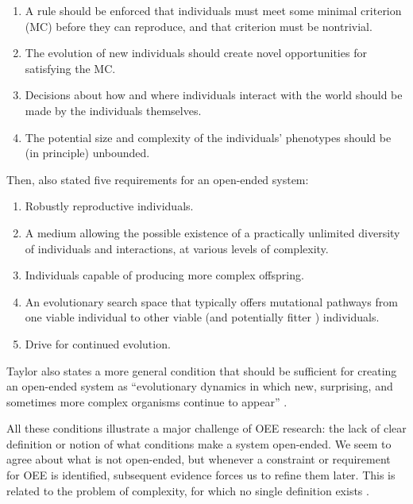 \begin{enumerate}
  \item A rule should be enforced that individuals must meet some minimal
        criterion (MC) before they can reproduce, and that criterion must be
        nontrivial.
  \item The evolution of new individuals should create novel opportunities for
        satisfying the MC.
  \item Decisions about how and where individuals interact with the world should
        be made by the individuals themselves.
  \item The potential size and complexity of the individuals' phenotypes should
        be (in principle) unbounded.
\end{enumerate}
Then, \cite{taylorRequirementsOpenEndedEvolution2015} also stated five
requirements for an open-ended system:

\begin{enumerate}
  \item Robustly reproductive individuals.
  \item A medium allowing the possible existence of a practically unlimited
        diversity of individuals and interactions, at various levels of
        complexity.
  \item Individuals capable of producing more complex offspring.
  \item An evolutionary search space that typically offers mutational pathways
        from one viable individual to other viable (and potentially fitter )
        individuals.
  \item Drive for continued evolution.
\end{enumerate}
Taylor also states a more general condition that should be sufficient for
creating an open-ended system as ``evolutionary dynamics in which new,
surprising, and sometimes more complex organisms continue to appear''
\parencite{taylorRequirementsOpenEndedEvolution2015,
  taylorOpenEndedEvolutionPerspectives2016}.

All these conditions illustrate a major challenge of \ac{OEE} research: the lack
of clear definition or notion of what conditions make a system open-ended. We
seem to agree about what is not open-ended, but whenever a constraint or
requirement for \ac{OEE} is identified, subsequent evidence forces us to refine
them later. This is related to the problem of complexity, for which no single
definition exists \parencite{johnsonSimplyComplexityClear2009}.

